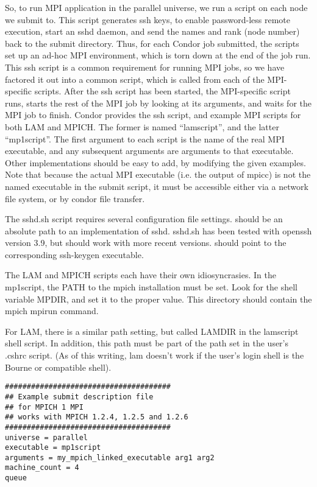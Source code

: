 So, to run MPI application in the parallel universe, we run a script
on each node we submit to.  This script generates ssh keys, to enable
password-less remote execution, start an sshd daemon, and send the
names and rank (node number) back to the submit directory.  Thus, for
each Condor job submitted, the scripts set up an ad-hoc MPI
environment, which is torn down at the end of the job run.  This ssh
script is a common requirement for running MPI jobs, so we have
factored it out into a common script, which is called from each of the
MPI-specific scripts.  After the ssh script has been started, the
MPI-specific script runs, starts the rest of the MPI job by looking at
its arguments, and waits for the MPI job to finish.  Condor provides
the ssh script, and example MPI scripts for both LAM and MPICH.  The
former is named ``lamscript'', and the latter ``mp1script''.  The
first argument to each script is the name of the real MPI executable,
and any subsequent arguments are arguments to that executable.  Other
implementations should be easy to add, by modifying the given
examples.  Note that because the actual MPI executable (i.e. the
output of mpicc) is not the named executable in the submit script, it
must be accessible either via a network file system, or by condor file
transfer.

The sshd.sh script requires several configuration file settings.
 should be an absolute path to an implementation of
sshd.  sshd.sh has been tested with openssh version 3.9, but should
work with more recent versions.   should
point to the corresponding ssh-keygen executable.

The LAM and MPICH scripts each have their own idiosyncrasies.  In the
mp1script, the PATH to the mpich installation must be set.  Look
for the shell variable MPDIR, and set it to the proper value.  This
directory should contain the mpich mpirun command.

For LAM, there is a similar path setting, but called LAMDIR in the
lamscript shell script.  In addition, this path must be part of the
path set in the user's .cshrc script.  (As of this writing, lam doesn't
work if the user's login shell is the Bourne or compatible shell).

\begin{verbatim}
######################################
## Example submit description file
## for MPICH 1 MPI
## works with MPICH 1.2.4, 1.2.5 and 1.2.6
######################################
universe = parallel
executable = mp1script
arguments = my_mpich_linked_executable arg1 arg2
machine_count = 4
queue
\end{verbatim}

